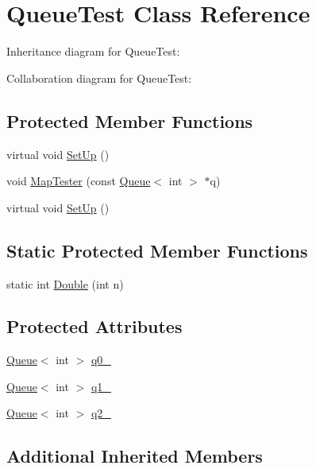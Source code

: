 \hypertarget{class_queue_test}{}\section{Queue\+Test Class Reference}
\label{class_queue_test}


Inheritance diagram for Queue\+Test\+:


Collaboration diagram for Queue\+Test\+:
\subsection*{Protected Member Functions}
\begin{DoxyCompactItemize}
\item 
virtual void \hyperlink{class_queue_test_a91e69958f086239a523864d6b94ab174}{Set\+Up} ()
\item 
void \hyperlink{class_queue_test_a7f1661cd16c428a130d6ac1e4246eaab}{Map\+Tester} (const \hyperlink{class_queue}{Queue}$<$ int $>$ $\ast$q)
\item 
virtual void \hyperlink{class_queue_test_a91e69958f086239a523864d6b94ab174}{Set\+Up} ()
\end{DoxyCompactItemize}
\subsection*{Static Protected Member Functions}
\begin{DoxyCompactItemize}
\item 
static int \hyperlink{class_queue_test_a2c7e0d1edb558dbbc4c085316d3d1ee6}{Double} (int n)
\end{DoxyCompactItemize}
\subsection*{Protected Attributes}
\begin{DoxyCompactItemize}
\item 
\hyperlink{class_queue}{Queue}$<$ int $>$ \hyperlink{class_queue_test_a0eba1fe2b31d75abd2df688ca5245e22}{q0\+\_\+}
\item 
\hyperlink{class_queue}{Queue}$<$ int $>$ \hyperlink{class_queue_test_a1e55594e71820ba0f1b09591fb328c30}{q1\+\_\+}
\item 
\hyperlink{class_queue}{Queue}$<$ int $>$ \hyperlink{class_queue_test_aeb7a2e3f6ce2d97d84eb1e01468adc2f}{q2\+\_\+}
\end{DoxyCompactItemize}
\subsection*{Additional Inherited Members}


